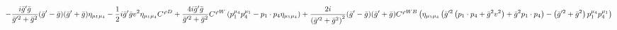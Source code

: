 %
\begin{dmath*}
%
  -  \frac{i {\bar g}^\prime {\bar g}{}}{{\bar g}^{\prime 2} + {\bar g}{}^2}({\bar g}^\prime - {\bar g}{}) ({\bar g}^\prime + {\bar g}{}) \eta_{\mu_1 \mu_4}  -  \frac{1}{2} i {\bar g}^\prime {\bar g}{} v^2\eta_{\mu_1 \mu_4} C^{ \varphi  D}  +  \frac{4 i {\bar g}^\prime {\bar g}{}}{{\bar g}^{\prime 2} + {\bar g}{}^2}C^{ \varphi  W} \left(p_1^{\mu_4} p_4^{\mu_1} - p_{1}\nobreak\cdot\nobreak{}p_{4} \eta_{\mu_1 \mu_4}\right)  +  \frac{2 i}{\left({\bar g}^{\prime 2} + {\bar g}{}^2\right)^2}({\bar g}^\prime - {\bar g}{}) ({\bar g}^\prime + {\bar g}{}) C^{ \varphi  WB} \left(\eta_{\mu_1 \mu_4} \left({\bar g}^{\prime 2} \left(p_{1}\nobreak\cdot\nobreak{}p_{4} + {\bar g}{}^2 v^2\right) + {\bar g}{}^2 p_{1}\nobreak\cdot\nobreak{}p_{4}\right) - \left({\bar g}^{\prime 2} + {\bar g}{}^2\right) p_1^{\mu_4} p_4^{\mu_1}\right)
%
\end{dmath*}
%
